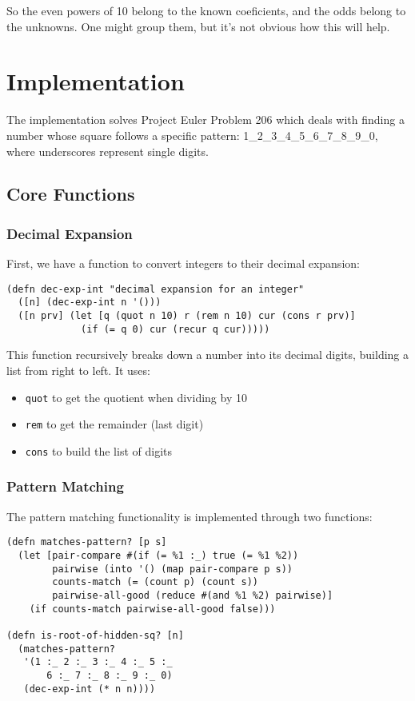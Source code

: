 \documentclass{article}
\begin{document}
So the even powers of 10 belong to the known coeficients, and the odds belong to the unknowns.  One might group
them, but it's not obvious how this will help.

\section{Implementation}

The implementation solves Project Euler Problem 206 which deals with finding a number whose square follows a specific pattern: 1_2_3_4_5_6_7_8_9_0, where underscores represent single digits.

\subsection{Core Functions}

\subsubsection{Decimal Expansion}
First, we have a function to convert integers to their decimal expansion:

\begin{lstlisting}
(defn dec-exp-int "decimal expansion for an integer"
  ([n] (dec-exp-int n '()))
  ([n prv] (let [q (quot n 10) r (rem n 10) cur (cons r prv)]
             (if (= q 0) cur (recur q cur)))))
\end{lstlisting}

This function recursively breaks down a number into its decimal digits, building a list from right to left. It uses:
\begin{itemize}
    \item \texttt{quot} to get the quotient when dividing by 10
    \item \texttt{rem} to get the remainder (last digit)
    \item \texttt{cons} to build the list of digits
\end{itemize}

\subsubsection{Pattern Matching}
The pattern matching functionality is implemented through two functions:

\begin{lstlisting}
(defn matches-pattern? [p s]
  (let [pair-compare #(if (= %1 :_) true (= %1 %2))
        pairwise (into '() (map pair-compare p s))
        counts-match (= (count p) (count s))
        pairwise-all-good (reduce #(and %1 %2) pairwise)]
    (if counts-match pairwise-all-good false)))

(defn is-root-of-hidden-sq? [n]
  (matches-pattern?
   '(1 :_ 2 :_ 3 :_ 4 :_ 5 :_
       6 :_ 7 :_ 8 :_ 9 :_ 0)
   (dec-exp-int (* n n))))
\end{lstlisting}
\end{document}
